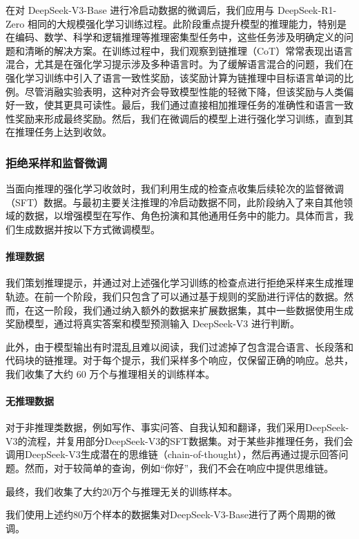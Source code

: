 \documentclass[lang=cn,a4paper,newtx]{elegantpaper}
\newcommand{\dsro}{DeepSeek-R1-Zero}
\begin{document}
在对 DeepSeek-V3-Base 进行冷启动数据的微调后，我们应用与 \dsro{} 相同的大规模强化学习训练过程。此阶段重点提升模型的推理能力，特别是在编码、数学、科学和逻辑推理等推理密集型任务中，这些任务涉及明确定义的问题和清晰的解决方案。在训练过程中，我们观察到链推理（CoT）常常表现出语言混合，尤其是在强化学习提示涉及多种语言时。为了缓解语言混合的问题，我们在强化学习训练中引入了语言一致性奖励，该奖励计算为链推理中目标语言单词的比例。尽管消融实验表明，这种对齐会导致模型性能的轻微下降，但该奖励与人类偏好一致，使其更具可读性。最后，我们通过直接相加推理任务的准确性和语言一致性奖励来形成最终奖励。然后，我们在微调后的模型上进行强化学习训练，直到其在推理任务上达到收敛。

\subsubsection{拒绝采样和监督微调}

当面向推理的强化学习收敛时，我们利用生成的检查点收集后续轮次的监督微调（SFT）数据。与最初主要关注推理的冷启动数据不同，此阶段纳入了来自其他领域的数据，以增强模型在写作、角色扮演和其他通用任务中的能力。具体而言，我们生成数据并按以下方式微调模型。
\label{sec:method:r1:sft}

\paragraph{推理数据}
我们策划推理提示，并通过对上述强化学习训练的检查点进行拒绝采样来生成推理轨迹。在前一个阶段，我们只包含了可以通过基于规则的奖励进行评估的数据。然而，在这一阶段，我们通过纳入额外的数据来扩展数据集，其中一些数据使用生成奖励模型，通过将真实答案和模型预测输入 DeepSeek-V3 进行判断。

此外，由于模型输出有时混乱且难以阅读，我们过滤掉了包含混合语言、长段落和代码块的链推理。对于每个提示，我们采样多个响应，仅保留正确的响应。总共，我们收集了大约 60 万个与推理相关的训练样本。

\paragraph{无推理数据}
对于非推理类数据，例如写作、事实问答、自我认知和翻译，我们采用DeepSeek-V3的流程，并复用部分DeepSeek-V3的SFT数据集。对于某些非推理任务，我们会调用DeepSeek-V3生成潜在的思维链（chain-of-thought），然后再通过提示回答问题。然而，对于较简单的查询，例如“你好”，我们不会在响应中提供思维链。

最终，我们收集了大约20万个与推理无关的训练样本。

我们使用上述约80万个样本的数据集对DeepSeek-V3-Base进行了两个周期的微调。
\end{document}
